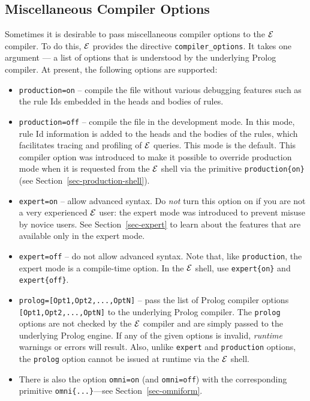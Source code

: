 \documentclass[11pt]{article}
\newcommand{\ERGO}{\mbox{\ensuremath{\cal{E}}\smaller{{\sc{RGO}}}}\xspace}
\newcommand{\FLSYSTEM}{\ERGO}
\begin{document}
\subsection{Miscellaneous Compiler Options}\label{misc-options}

Sometimes it is desirable to pass miscellaneous 
compiler options to the \FLSYSTEM
compiler. To do this, \FLSYSTEM provides the directive
{\tt compiler\_options}. It takes one argument --- a list of
options that is understood by the underlying Prolog compiler. At present,
the following options are supported:
\begin{itemize}
\item  \texttt{production=on} -- compile the file without various
  debugging features such as the rule Ids embedded in the heads and bodies
  of rules.
\item \texttt{production=off} -- compile the file in the development
  mode. In this mode, rule Id information is added to the heads and the
  bodies of the rules, which facilitates tracing and profiling of \FLSYSTEM
  queries. This mode is the default. This compiler option was introduced to
  make it possible to override production mode when it is
  requested from the \FLSYSTEM shell via the primitive
  \texttt{production\{on\}} (see Section~\ref{sec-production-shell}).
\item \texttt{expert=on} -- allow advanced syntax. 
  Do \emph{not} turn this option on if you are not a very
  experienced \FLSYSTEM user:
  the expert mode was introduced to prevent misuse by novice users.
  See Section~\ref{sec-expert} to learn about the features that are
  available only in the expert mode.
\item \texttt{expert=off} -- do not allow advanced syntax. Note that,
  like \texttt{production}, the expert mode is a compile-time option.
  In the \FLSYSTEM shell, use \texttt{expert\{on\}} and
  \texttt{expert\{off\}}.
\item \texttt{prolog=[Opt1,Opt2,...,OptN]} -- pass the list of Prolog
  compiler options \texttt{[Opt1,Opt2,...,OptN]} to the underlying Prolog
  compiler.  The \texttt{prolog} options are not checked by the \FLSYSTEM
  compiler and are simply passed to the underlying Prolog engine. If any of
  the given options is invalid, \emph{runtime} warnings or errors will result.
  Also, unlike \texttt{expert} and \texttt{production} options, the
  \texttt{prolog} option cannot be issued at runtime via the \FLSYSTEM
  shell.
  \item There is also the option \texttt{omni=on} (and
    \texttt{omni=off}) with the corresponding primitive
    \texttt{omni\{...\}}---see Section~\ref{sec-omniform}.
\end{itemize}
\end{document}
